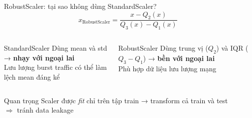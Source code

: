 \documentclass[aspectratio=169,12pt]{beamer}
\begin{document}
\begin{frame}{RobustScaler: tại sao không dùng StandardScaler?}
  \[
    x_{\text{RobustScaler}} = \frac{x - Q_2(x)}{Q_3(x) - Q_1(x)}
  \]
  \begin{columns}[T]
      \begin{block}{StandardScaler}
        Dùng mean và std → \textbf{nhạy với ngoại lai}\\
        Lưu lượng burst traffic có thể làm lệch mean đáng kể
      \end{block}
      \begin{block}{RobustScaler}
        Dùng trung vị ($Q_2$) và IQR ($Q_3-Q_1$) → \textbf{bền với ngoại lai}\\
        Phù hợp dữ liệu lưu lượng mạng
      \end{block}
  \end{columns}
  \vspace{0.4em}
  \begin{alertblock}{Quan trọng}
    Scaler được \textit{fit} chỉ trên tập train → transform cả train và test\\
    $\Rightarrow$ tránh data leakage
  \end{alertblock}
\end{frame}
\end{document}
